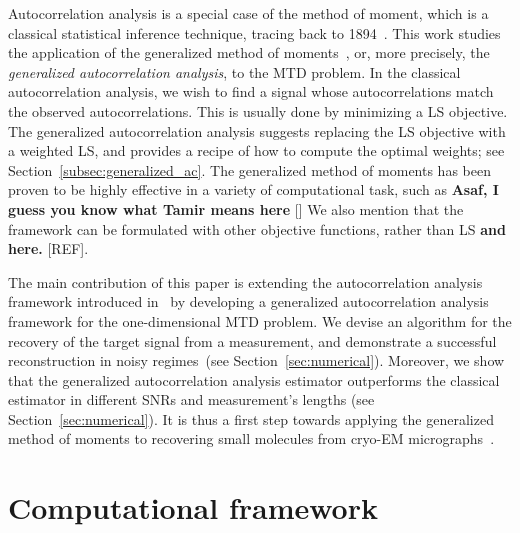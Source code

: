 \documentclass{article}
\begin{document}
Autocorrelation analysis is a special case of the method of moment, which is a classical statistical inference technique, tracing back to 1894~\cite{pearson1894contributions}. This work studies the application of the generalized method of moments~\cite{Hansen1982}, or, more precisely, the \textit{generalized autocorrelation analysis}, to the MTD problem. In the classical autocorrelation analysis, we wish to find a signal whose autocorrelations match the observed autocorrelations. This is usually done by minimizing a LS objective. The generalized autocorrelation analysis suggests replacing the LS objective with a weighted LS, and provides a recipe of how to compute the optimal weights; see Section~\ref{subsec:generalized_ac}. The generalized method of moments has been proven to be highly effective in a variety of computational task, such as \textbf{Asaf, I guess you know what Tamir means here} [] %
We also mention that the framework can be formulated with other objective functions, rather than LS \textbf{and here.} [REF].

The main contribution of this paper is extending the autocorrelation analysis framework introduced in~\cite{bendory2019multi} by developing a generalized autocorrelation analysis framework for the one-dimensional MTD problem. We devise an algorithm for the recovery of the target signal from a measurement, and demonstrate a successful reconstruction in noisy regimes~(see Section~\ref{sec:numerical}). Moreover, we show that the generalized autocorrelation analysis estimator outperforms the classical estimator in different SNRs and measurement's lengths (see Section~\ref{sec:numerical}). It is thus a first step towards applying the generalized method of moments to recovering small molecules from \mbox{cryo-EM} micrographs~\cite{bendory2018toward}.

\section{Computational framework}
\label{sec:math}
\end{document}
